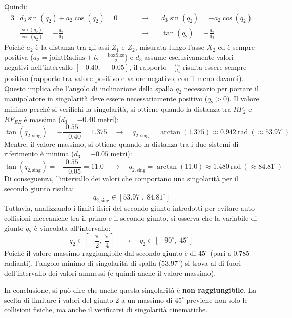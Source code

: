 ﻿\documentclass[11pt, a4paper]{article}
\begin{document}
Quindi:
\begin{alignat*}{3}
    & d_3 \sin(q_2) + a_2 \cos(q_2) = 0 &\quad&&\rightarrow\quad
    & d_3 \sin(q_2) = - a_2 \cos(q_2) \\
    & \frac{\sin(q_{2})}{\cos(q_{2})} = - \frac{a_{2}}{d_{3}} &\quad&&\rightarrow\quad & \tan(q_{2}) = - \frac{a_{2}}{d_{3}}
\end{alignat*}
Poiché $a_{2}$ è la distanza tra gli assi $Z_{1}$ e $Z_{2}$, misurata lungo l'asse \(X_2\) ed è sempre positiva ($a_2 = \text{jointRadius} + l_{2} + \frac{\text{boxSize}}{2}$) e $d_3$ assume esclusivamente valori negativi nell'intervallo $[-0.40, \; -0.05]$, il rapporto $-\frac{a_2}{d_3}$ risulta essere sempre positivo (rapporto tra valore positivo e valore negativo, con il meno davanti).
\newpage
Questo implica che l'angolo di inclinazione della spalla $q_2$ necessario per portare il manipolatore in singolarità deve essere necessariamente positivo ($q_2 > 0$).
Il valore minimo perché si verifichi la singolarità, si ottiene quando la distanza tra $RF_{2}$ e $RF_{EE}$ è massima ($d_3 = -0.40$ metri):
\[
    \tan(q_{2,\text{sing}}) = -\frac{0.55}{-0.40} = 1.375 \quad\longrightarrow\quad q_{2,\text{sing}} = \arctan(1.375) \approx 0.942 \ \text{rad} \ (\approx 53.97^\circ)
\]
Mentre, il valore massimo, si ottiene quando la distanza tra i due sistemi di riferimento è minima ($d_3 = -0.05$ metri):
\[
    \tan(q_{2,\text{sing}}) = -\frac{0.55}{-0.05} = 11.0 \quad\longrightarrow\quad q_{2,\text{sing}} = \arctan(11.0) \approx 1.480 \ \text{rad} \ (\approx 84.81^\circ)
\]
Di conseguenza, l'intervallo dei valori che comportano una singolarità per il secondo giunto risulta:
\[
    q_{2,\text{sing}} \in [53.97^\circ, \; 84.81^\circ]
\]
Tuttavia, analizzando i limiti fisici del secondo giunto introdotti per evitare auto-collisioni meccaniche tra il primo e il secondo giunto, si osserva che la variabile di giunto $q_2$ è vincolata all'intervallo:
\[
    q_2 \in \left[-\frac{\pi}{2}, \; \frac{\pi}{4}\right] \quad\longrightarrow\quad q_2 \in [-90^\circ, \; 45^\circ]
\]
Poiché il valore massimo raggiungibile dal secondo giunto è di $45^\circ$ (pari a $0.785$ radianti), l'angolo minimo di singolarità di spalla ($53.97^\circ$) si trova al di fuori dell'intervallo dei valori ammessi (e quindi anche il valore massimo).

In conclusione, si può dire che anche questa singolarità è \textbf{non raggiungibile}. La scelta di limitare i valori del giunto 2 a un massimo di $45^\circ$ previene non solo le collisioni fisiche, ma anche il verificarsi di singolarità cinematiche.
\end{document}
